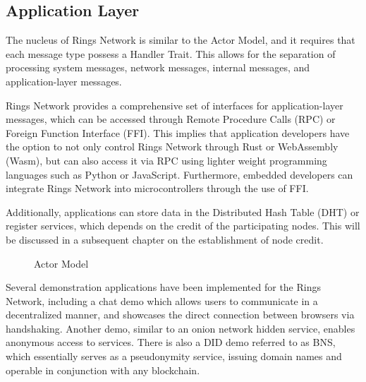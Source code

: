 \documentclass[twocolumn]{article}
\begin{document}
\subsection{Application Layer}

The nucleus of Rings Network is similar to the Actor Model\cite{Actor_Model}, and it requires that each message type possess a Handler Trait. This allows for the separation of processing system messages, network messages, internal messages, and application-layer messages.

Rings Network provides a comprehensive set of interfaces for application-layer messages, which can be accessed through Remote Procedure Calls (RPC) or Foreign Function Interface (FFI). This implies that application developers have the option to not only control Rings Network through Rust or WebAssembly (Wasm), but can also access it via RPC using lighter weight programming languages such as Python or JavaScript. Furthermore, embedded developers can integrate Rings Network into microcontrollers through the use of FFI.

Additionally, applications can store data in the Distributed Hash Table (DHT) or register services, which depends on the credit of the participating nodes. This will be discussed in a subsequent chapter on the establishment of node credit.


\begin{figure}[htpb]
  \begin{center}
\end{center}
\caption{Actor Model}

\end{figure}

Several demonstration applications have been implemented for the Rings Network, including a chat demo which allows users to communicate in a decentralized manner, and showcases the direct connection between browsers via handshaking. Another demo, similar to an onion network hidden service, enables anonymous access to services. There is also a DID demo referred to as BNS, which essentially serves as a pseudonymity service, issuing domain names and operable in conjunction with any blockchain.
\end{document}
